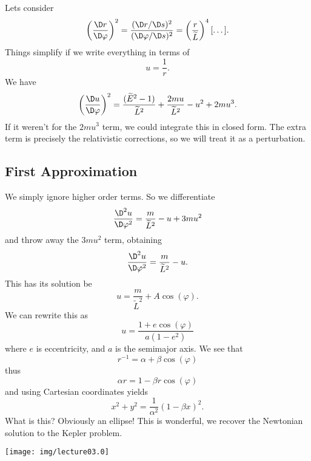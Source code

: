 Lets consider
\begin{equation}
\left(\frac{\D r}{\D\varphi}\right)^{2}=\frac{(\D r/\D s)^{2}}{(\D\varphi/\D s)^{2}}
=\left(\frac{r}{\widetilde{L}}\right)^{4}[\dots].
\end{equation}
Things simplify if we write everything in terms of
\begin{equation}
u=\frac{1}{r}.
\end{equation}
We have
\begin{equation}
\left(\frac{\D u}{\D\varphi}\right)^{2}=
\frac{(\widetilde{E}^{2}-1)}{\widetilde{L}^{2}}
+\frac{2mu}{\widetilde{L}^{2}}
-u^{2}+2mu^{3}.
\end{equation}
If it weren't for the $2mu^{3}$ term, we could integrate this in
closed form. The extra term is precisely the relativistic
corrections, so we will treat it as a perturbation.

\subsection{First Approximation}
We simply ignore higher order terms. So we differentiate
\begin{equation}
\frac{\D^{2}u}{\D\varphi^{2}}=\frac{m}{\widetilde{L}^{2}}-u+3mu^{2}
\end{equation}
and throw away the $3mu^{2}$ term, obtaining
\begin{equation}
\frac{\D^{2}u}{\D\varphi^{2}}=\frac{m}{\widetilde{L}^{2}}-u.
\end{equation}
This has its solution be
\begin{equation}
u=\frac{m}{\widetilde{L}^{2}}+A\cos(\varphi).
\end{equation}
We can rewrite this as
\begin{equation}
u=\frac{1+e\cos(\varphi)}{a(1-e^{2})}
\end{equation}
where $e$ is eccentricity, and $a$ is the semimajor axis. We see
that
\begin{equation}
r^{-1}=\alpha+\beta\cos(\varphi)
\end{equation}
thus
\begin{equation}
\alpha r=1-\beta r\cos(\varphi)
\end{equation}
and using Cartesian coordinates yields
\begin{equation}
x^{2}+y^{2}=\frac{1}{\alpha^{2}}(1-\beta x)^{2}.
\end{equation}
What is this? Obviously an ellipse! This is wonderful, we recover
the Newtonian solution to the Kepler problem.
\begin{center}
  \texttt{[image: img/lecture03.0]}
\end{center}

